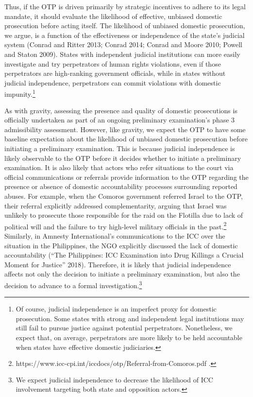 Thus, if the OTP is driven primarily by strategic incentives to adhere to its legal mandate, it should evaluate the likelihood of effective, unbiased domestic prosecution before acting itself. The likelihood of unbiased domestic prosecution, we argue, is a function of the effectiveness or independence of the state's judicial system (Conrad and Ritter 2013; Conrad 2014; Conrad and Moore 2010; Powell and Staton 2009). States with independent judicial institutions can more easily investigate and try perpetrators of human rights violations, even if those perpetrators are high-ranking government officials, while in states without judicial independence, perpetrators can commit violations with domestic impunity.\footnote{Of course, judicial independence is an imperfect proxy for domestic prosecution. Some states with strong and independent legal institutions may still fail to pursue justice against potential perpetrators. Nonetheless, we expect that, on average, perpetrators are more likely to be held accountable when states have effective domestic judiciaries.}

As with gravity, assessing the presence and quality of domestic prosecutions is officially undertaken as part of an ongoing preliminary examination's phase 3 admissibility assessment. However, like gravity, we expect the OTP to have some baseline expectation about the likelihood of unbiased domestic prosecution before initiating a preliminary examination. This is because judicial independence is likely observable to the OTP before it decides whether to initiate a preliminary examination. It is also likely that actors who refer situations to the court via official communications or referrals provide information to the OTP regarding the presence or absence of domestic accountability processes surrounding reported abuses. For example, when the Comoros government referred Israel to the OTP, their referral explicitly addressed complementarity, arguing that Israel was unlikely to prosecute those responsible for the raid on the Flotilla due to lack of political will and the failure to try high-level military officials in the past.\footnote{https://www.icc-cpi.int/iccdocs/otp/Referral-from-Comoros.pdf .} Similarly, in Amnesty International's communications to the ICC over the situation in the Philippines, the NGO explicitly discussed the lack of domestic accountability (``The Philippines: ICC Examination into Drug Killings a Crucial Moment for Justice'' 2018). Therefore, it is likely that judicial independence affects not only the decision to initiate a preliminary examination, but also the decision to advance to a formal investigation.\footnote{We expect judicial independence to decrease the likelihood of ICC involvement targeting both state and opposition actors.}

